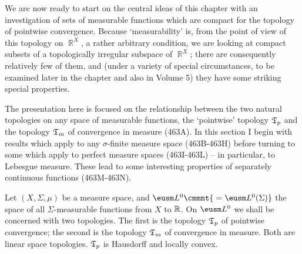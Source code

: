 
\def\chaptername{Pointwise compact sets of measurable functions}
\def\sectionname{$\frak T_p$ and $\frak T_m$}

\def\headlinesectionname{$\eightfrak T_p$ and
$\eightfrak T_m$}

We are now ready to start on the central ideas of this chapter with an
investigation of sets of measurable functions which are compact for the
topology of pointwise convergence.   Because `measurability' is, from
the point of view of this topology on $\BbbR^X$, a rather arbitrary
condition, we are looking at compact subsets of a topologically
irregular subspace of $\BbbR^X$;  there are consequently relatively few
of them, and (under a variety of special circumstances, to be examined
later in the chapter and also in Volume 5) they have some striking
special properties.

The presentation here is focused on the relationship between the two
natural topologies on any space of measurable functions, the `pointwise'
topology $\frak T_p$ and the topology $\frak T_m$ of convergence in
measure (463A).   In this section I begin with results which apply to
any $\sigma$-finite measure space (463B-463H) before turning to some
which apply to perfect measure spaces (463I-463L) -- in particular, to
Lebesgue measure.   These lead to some interesting properties of
separately continuous functions (463M-463N).

 Let $(X,\Sigma,\mu)$ be a measure space, and
$\eusm L^0\cmmnt{\mskip5mu =\eusm L^0(\Sigma)}$ the space of all
$\Sigma$-measurable functions from $X$ to $\Bbb R$.   On $\eusm L^0$ we
shall be concerned with two topologies.   The
first is the topology $\frak T_p$ of pointwise
convergence;  the second is the topology $\frak T_m$
of convergence in measure.   Both
are linear space topologies.      
$\frak T_p$ is
Hausdorff and locally convex.

